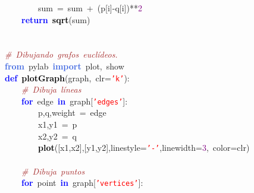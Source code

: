 \mbox{}\ \ \ \ \ \ \ \ sum\ \textcolor{BrickRed}{=}\ sum\ \textcolor{BrickRed}{+}\ \textcolor{BrickRed}{(}p\textcolor{BrickRed}{[}i\textcolor{BrickRed}{]-}q\textcolor{BrickRed}{[}i\textcolor{BrickRed}{])**}\textcolor{Purple}{2} \\
\mbox{}\ \ \ \ \textbf{\textcolor{Blue}{return}}\ \textbf{\textcolor{Black}{sqrt}}\textcolor{BrickRed}{(}sum\textcolor{BrickRed}{)} \\
\mbox{} \\
\mbox{} \\
\mbox{}\textit{\textcolor{Brown}{\#\ Dibujando\ grafos\ euclídeos.}} \\
\mbox{}\textbf{\textcolor{RoyalBlue}{from}}\ pylab\ \textbf{\textcolor{RoyalBlue}{import}}\ plot\textcolor{BrickRed}{,}\ show \\
\mbox{}\textbf{\textcolor{Blue}{def}}\ \textbf{\textcolor{Black}{plotGraph}}\textcolor{BrickRed}{(}graph\textcolor{BrickRed}{,}\ clr\textcolor{BrickRed}{=}\texttt{\textcolor{Red}{'k'}}\textcolor{BrickRed}{):} \\
\mbox{}\ \ \ \ \textit{\textcolor{Brown}{\#\ Dibuja\ líneas}} \\
\mbox{}\ \ \ \ \textbf{\textcolor{Blue}{for}}\ edge\ \textbf{\textcolor{Blue}{in}}\ graph\textcolor{BrickRed}{[}\texttt{\textcolor{Red}{'edges'}}\textcolor{BrickRed}{]:} \\
\mbox{}\ \ \ \ \ \ \ \ p\textcolor{BrickRed}{,}q\textcolor{BrickRed}{,}weight\ \textcolor{BrickRed}{=}\ edge \\
\mbox{}\ \ \ \ \ \ \ \ x1\textcolor{BrickRed}{,}y1\ \textcolor{BrickRed}{=}\ p \\
\mbox{}\ \ \ \ \ \ \ \ x2\textcolor{BrickRed}{,}y2\ \textcolor{BrickRed}{=}\ q \\
\mbox{}\ \ \ \ \ \ \ \ \textbf{\textcolor{Black}{plot}}\textcolor{BrickRed}{([}x1\textcolor{BrickRed}{,}x2\textcolor{BrickRed}{],[}y1\textcolor{BrickRed}{,}y2\textcolor{BrickRed}{],}linestyle\textcolor{BrickRed}{=}\texttt{\textcolor{Red}{'-'}}\textcolor{BrickRed}{,}linewidth\textcolor{BrickRed}{=}\textcolor{Purple}{3}\textcolor{BrickRed}{,}\ color\textcolor{BrickRed}{=}clr\textcolor{BrickRed}{)} \\
\mbox{} \\
\mbox{}\ \ \ \ \textit{\textcolor{Brown}{\#\ Dibuja\ puntos}} \\
\mbox{}\ \ \ \ \textbf{\textcolor{Blue}{for}}\ point\ \textbf{\textcolor{Blue}{in}}\ graph\textcolor{BrickRed}{[}\texttt{\textcolor{Red}{'vertices'}}\textcolor{BrickRed}{]:} \\
